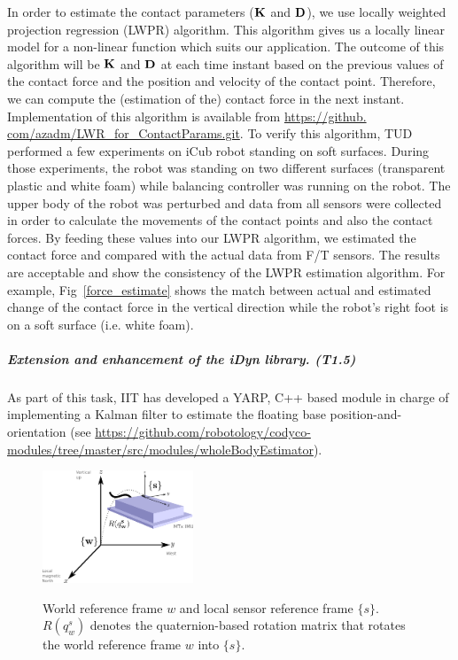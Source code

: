 In order to estimate the contact parameters ($\mathbf{K}$ and $\mathbf{D}$), we use locally
weighted projection regression (LWPR) algorithm.  This algorithm gives us a
locally linear model for a non-linear function which suits our application.
The outcome of this algorithm will be $\mathbf{K}$ and $\mathbf{D}$ at each time instant
based on the previous values of the contact force and the position and
velocity of the contact point.  Therefore, we can compute the (estimation of
the) contact force in the next instant.  Implementation of this algorithm is
available from \url{https://github. com/azadm/LWR_for_ContactParams.git}.  To
verify this algorithm, TUD performed a few experiments on iCub robot standing
on soft surfaces.  During those experiments, the robot was standing on two
different surfaces (transparent plastic and white foam) while balancing
controller was running on the robot.  The upper body of the robot was
perturbed and data from all sensors were collected in order to calculate the
movements of the contact points and also the contact forces.  By feeding these
values into our LWPR algorithm, we estimated the contact force and compared
with the actual data from F/T sensors.  The results are acceptable and show
the consistency of the LWPR estimation algorithm.  For example,
Fig~\ref{force_estimate} shows the match between actual and estimated change
of the contact force in the vertical direction while the robot's right foot is
on a soft surface (i.e. white foam).
%



\subparagraph*{Extension and enhancement of the iDyn library. (T1.5)}
\label{sec:T15}

As part of this task, IIT has developed a YARP, C++ based  module in charge of implementing a Kalman filter to estimate the floating base position-and-orientation 
(see \url{https://github.com/robotology/codyco-modules/tree/master/src/modules/wholeBodyEstimator}). 
\begin{figure}[t!]
 \centering
 \includegraphics[width=0.4\textwidth]{images/MixCoordSys.png}
 \label{fig:coordsys}
 \caption{World reference frame $w$ and local sensor reference frame $\{s\}$. $R(q^{s}_{w})$ denotes the quaternion-based rotation matrix that rotates the world reference frame $w$ into $\{s\}$. }
\end{figure}

